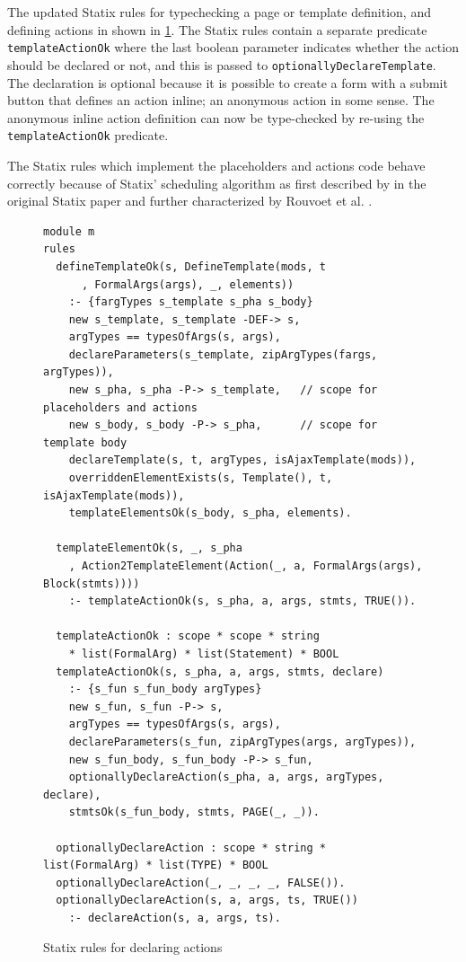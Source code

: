     The updated Statix rules for typechecking a page or template definition, and defining actions in shown in \cref{fig:actions-placeholders-statix}. The Statix rules contain a separate predicate \texttt{templateActionOk} where the last boolean parameter indicates whether the action should be declared or not, and this is passed to \texttt{optionallyDeclareTemplate}. The declaration is optional because it is possible to create a form with a submit button that defines an action inline; an anonymous action in some sense. The anonymous inline action definition can now be type-checked by re-using the \texttt{templateActionOk} predicate.

    The Statix rules which implement the placeholders and actions code behave correctly because of Statix' scheduling algorithm as first described by in the original Statix paper \autocite{VanAntwerpen2018} and further characterized by Rouvoet et al. \autocite{RouvoetAPKV20}.

    \begin{figure}
      \begin{verbatim}
module m
rules
  defineTemplateOk(s, DefineTemplate(mods, t
      , FormalArgs(args), _, elements))
    :- {fargTypes s_template s_pha s_body}
    new s_template, s_template -DEF-> s,
    argTypes == typesOfArgs(s, args),
    declareParameters(s_template, zipArgTypes(fargs, argTypes)),
    new s_pha, s_pha -P-> s_template,   // scope for placeholders and actions
    new s_body, s_body -P-> s_pha,      // scope for template body
    declareTemplate(s, t, argTypes, isAjaxTemplate(mods)),
    overriddenElementExists(s, Template(), t, isAjaxTemplate(mods)),
    templateElementsOk(s_body, s_pha, elements).

  templateElementOk(s, _, s_pha
    , Action2TemplateElement(Action(_, a, FormalArgs(args), Block(stmts))))
    :- templateActionOk(s, s_pha, a, args, stmts, TRUE()).

  templateActionOk : scope * scope * string
    * list(FormalArg) * list(Statement) * BOOL
  templateActionOk(s, s_pha, a, args, stmts, declare)
    :- {s_fun s_fun_body argTypes}
    new s_fun, s_fun -P-> s,
    argTypes == typesOfArgs(s, args),
    declareParameters(s_fun, zipArgTypes(args, argTypes)),
    new s_fun_body, s_fun_body -P-> s_fun,
    optionallyDeclareAction(s_pha, a, args, argTypes, declare),
    stmtsOk(s_fun_body, stmts, PAGE(_, _)).

  optionallyDeclareAction : scope * string * list(FormalArg) * list(TYPE) * BOOL
  optionallyDeclareAction(_, _, _, _, FALSE()).
  optionallyDeclareAction(s, a, args, ts, TRUE())
    :- declareAction(s, a, args, ts).
      \end{verbatim}
      \caption{\label{fig:actions-placeholders-statix}Statix rules for declaring actions}
    \end{figure}

